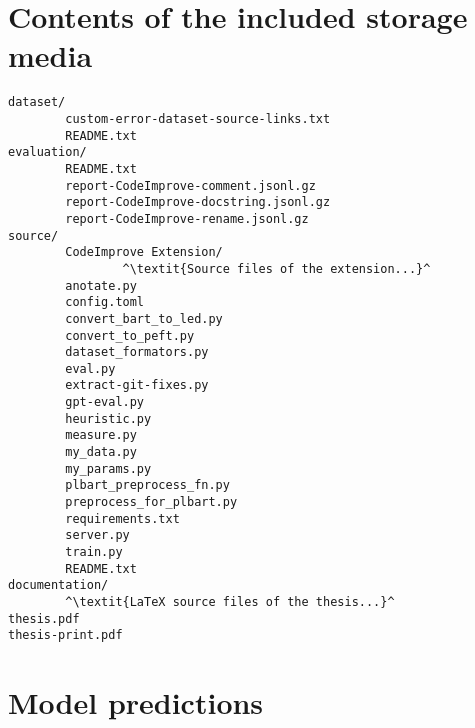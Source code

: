 
%

\chapter{Contents of the included storage media}

\begin{lstlisting}[numbers=none]
dataset/
        custom-error-dataset-source-links.txt
        README.txt
evaluation/
        README.txt
        report-CodeImprove-comment.jsonl.gz
        report-CodeImprove-docstring.jsonl.gz
        report-CodeImprove-rename.jsonl.gz
source/
        CodeImprove Extension/
                ^\textit{Source files of the extension...}^
        anotate.py
        config.toml
        convert_bart_to_led.py
        convert_to_peft.py
        dataset_formators.py
        eval.py
        extract-git-fixes.py
        gpt-eval.py
        heuristic.py
        measure.py
        my_data.py
        my_params.py
        plbart_preprocess_fn.py
        preprocess_for_plbart.py
        requirements.txt
        server.py
        train.py
        README.txt
documentation/
        ^\textit{LaTeX source files of the thesis...}^
thesis.pdf
thesis-print.pdf
\end{lstlisting}




\chapter{Model predictions}
